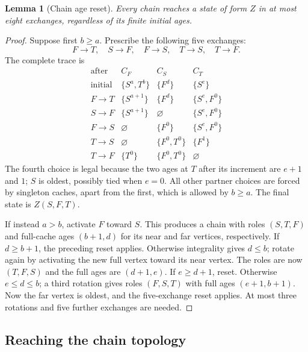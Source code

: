 \documentclass[11pt]{article}
\newtheorem{lemma}[theorem]{Lemma}
\begin{document}
\begin{lemma}[Chain age reset]
\label{lem:chainreset}
Every chain reaches a state of form $Z$ in at most eight exchanges,
regardless of its finite initial ages.
\end{lemma}
\begin{proof}
Suppose first $b\ge a$. Prescribe the following five exchanges:
\[
 F\to T,\quad S\to F,\quad F\to S,\quad T\to S,\quad T\to F.
\]
The complete trace is
\[
\begin{array}{c|lll}
 \text{after}&C_F&C_S&C_T\\ \hline
 \text{initial}&\{S^a,T^b\}&\{F^d\}&\{S^e\}\\
 F\to T&\{S^{a+1}\}&\{F^d\}&\{S^e,F^0\}\\
 S\to F&\{S^{a+1}\}&\varnothing&\{S^e,F^0\}\\
 F\to S&\varnothing&\{F^0\}&\{S^e,F^0\}\\
 T\to S&\varnothing&\{F^0,T^0\}&\{F^1\}\\
 T\to F&\{T^0\}&\{F^0,T^0\}&\varnothing
\end{array}
\]
The fourth choice is legal because the two ages at $T$ after its
increment are $e+1$ and $1$; $S$ is oldest, possibly tied when $e=0$.
All other partner choices are forced by singleton caches, apart
from the first, which is allowed by $b\ge a$.
The final state is $Z(S,F,T)$.

If instead $a>b$, activate $F$ toward $S$. This produces a chain
with roles $(S,T,F)$ and full-cache ages $(b+1,d)$ for its near
and far vertices, respectively. If $d\ge b+1$, the preceding reset
applies. Otherwise integrality gives $d\le b$; rotate again by
activating the new full vertex toward its near vertex.
The roles are now $(T,F,S)$ and the full ages are $(d+1,e)$.
If $e\ge d+1$, reset. Otherwise $e\le d\le b$; a third rotation
gives roles $(F,S,T)$ with full ages $(e+1,b+1)$.
Now the far vertex is oldest, and the five-exchange reset applies.
At most three rotations and five further exchanges are needed.
\end{proof}

\subsection{Reaching the chain topology}
\end{document}
